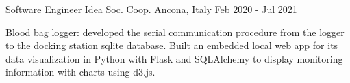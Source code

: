 \begin{cventries}
  \cventry
    {Software Engineer} %
    {\href{https://www.idea-on-line.it/}{%
    Idea Soc. Coop.}} %
    {Ancona, Italy} %
    {Feb 2020 - Jul 2021} %
    {
      \begin{cvitems} %
      \item {\href{https://www.idea-on-line.it/progetti/boset/}{%
      Blood bag logger}: 
      developed the serial communication procedure from the logger 
      to the docking station sqlite database. 
      Built an embedded local web app for its data visualization
      in Python with Flask and SQLAlchemy to display monitoring information 
      with charts using d3.js.}
      \end{cvitems}
    }
    

\end{cventries}
